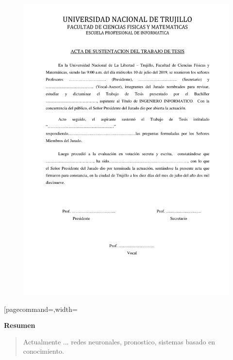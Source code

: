 \begin{figure}[htp]
\centering
\includegraphics[scale=0.9]{Acta_Sustentacion.pdf}
\end{figure}
[pagecommand={},width=\textwidth {Acta_Sustentacion.pdf}



\newpage
\begin{center}
 {\bf\LARGE Resumen}
\end{center} 
\vskip 0.5cm
\begin{quotation}
Actualmente ...
\vskip 0.3cm
\hspace*{-0.6cm}{\bf Palabras claves:} redes neuronales, pronostico, sistemas basado en conocimiento.
\end{quotation}


